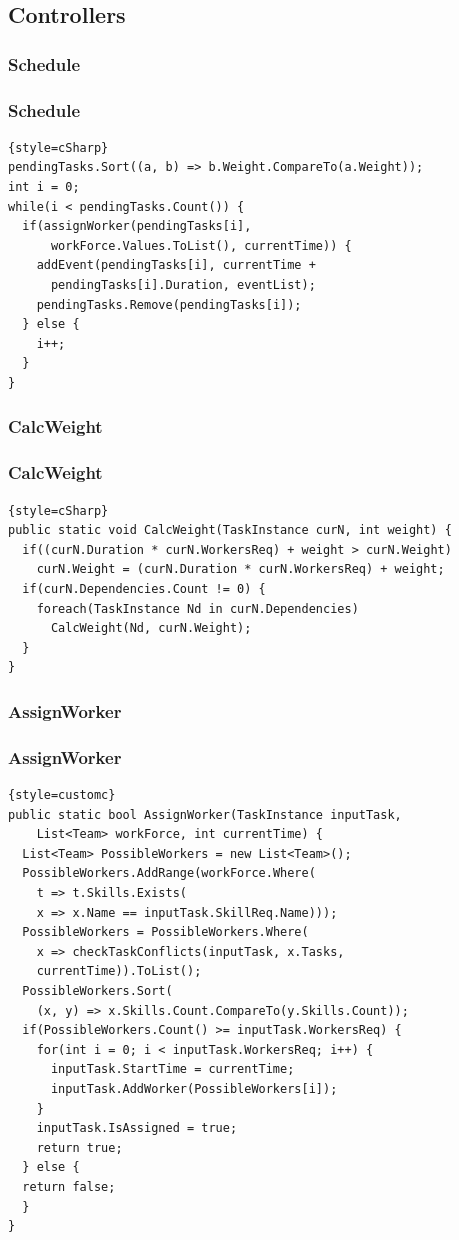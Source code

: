 \subsection{Controllers}
\subsubsection{Schedule}
\begin{frame}[fragile]
\frametitle{Schedule}
\fontsize{8pt}{7}\selectfont
\begin{lstlisting}{style=cSharp}
pendingTasks.Sort((a, b) => b.Weight.CompareTo(a.Weight));
int i = 0;
while(i < pendingTasks.Count()) {
  if(assignWorker(pendingTasks[i],
      workForce.Values.ToList(), currentTime)) {
    addEvent(pendingTasks[i], currentTime +
      pendingTasks[i].Duration, eventList);
    pendingTasks.Remove(pendingTasks[i]);
  } else {
    i++;
  }
}
\end{lstlisting}
\end{frame}

\newpage

\subsubsection{CalcWeight}
\begin{frame}[fragile]
\frametitle{CalcWeight}
\fontsize{8pt}{7}\selectfont
\begin{lstlisting}{style=cSharp}
public static void CalcWeight(TaskInstance curN, int weight) {
  if((curN.Duration * curN.WorkersReq) + weight > curN.Weight)
    curN.Weight = (curN.Duration * curN.WorkersReq) + weight;
  if(curN.Dependencies.Count != 0) {
    foreach(TaskInstance Nd in curN.Dependencies)
      CalcWeight(Nd, curN.Weight);
  }
}
\end{lstlisting}
\end{frame}

\newpage

\subsubsection{AssignWorker}
\begin{frame}[fragile]
\frametitle{AssignWorker}
\fontsize{8pt}{7}\selectfont
\begin{lstlisting}{style=customc}
public static bool AssignWorker(TaskInstance inputTask,
    List<Team> workForce, int currentTime) {
  List<Team> PossibleWorkers = new List<Team>();
  PossibleWorkers.AddRange(workForce.Where(
    t => t.Skills.Exists(
    x => x.Name == inputTask.SkillReq.Name)));
  PossibleWorkers = PossibleWorkers.Where(
    x => checkTaskConflicts(inputTask, x.Tasks,
    currentTime)).ToList();
  PossibleWorkers.Sort(
    (x, y) => x.Skills.Count.CompareTo(y.Skills.Count));
  if(PossibleWorkers.Count() >= inputTask.WorkersReq) {
    for(int i = 0; i < inputTask.WorkersReq; i++) {
      inputTask.StartTime = currentTime;
      inputTask.AddWorker(PossibleWorkers[i]);
    }
    inputTask.IsAssigned = true;
    return true;
  } else {
  return false;
  }
}
\end{lstlisting}
\end{frame}

